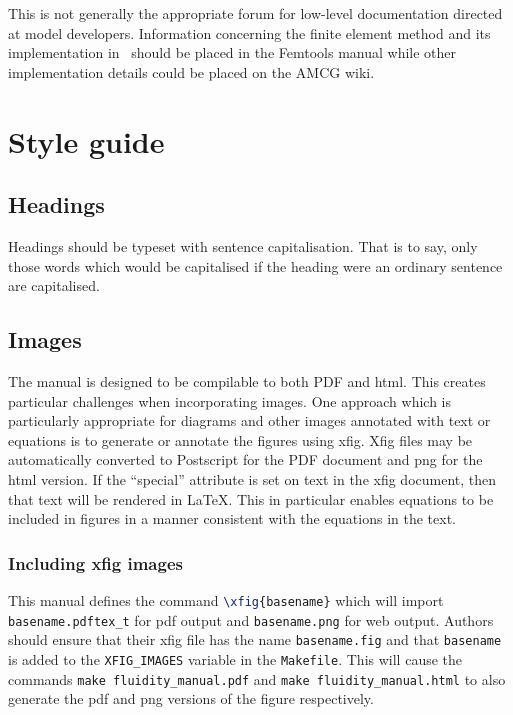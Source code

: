 This is not generally the appropriate forum for low-level documentation
directed at model developers. Information concerning the finite element
method and its implementation in \fluidity\ should be placed in the Femtools
manual while other implementation details could be placed on the AMCG wiki.

\section{Style guide}

\subsection{Headings}

Headings should be typeset with sentence capitalisation. That is to say,
only those words which would be capitalised if the heading were an ordinary
sentence are capitalised.

\subsection{Images}

The manual is designed to be compilable to both PDF and html. This creates
particular challenges when incorporating images. One approach which is
particularly appropriate for diagrams and other images annotated with text
or equations is to generate or annotate the figures using xfig. Xfig files
may be automatically converted to Postscript for the PDF document and png
for the html version. If the ``special'' attribute is set on text in the
xfig document, then that text will be rendered in \LaTeX. This in particular
enables equations to be included in figures in a manner consistent with the
equations in the text.

\subsubsection{Including xfig images}

This manual defines the command \lstinline[language=TeX]+\xfig{basename}+
which will import \verb+basename.pdftex_t+ for pdf output and
\verb+basename.png+ for web output. Authors should ensure that their xfig
file has the name \verb+basename.fig+ and that \verb+basename+ is added to
the \verb+XFIG_IMAGES+ variable in the \verb+Makefile+. This will cause the
commands \verb+make fluidity_manual.pdf+ and
\verb+make fluidity_manual.html+ to also generate the pdf and png versions
of the figure respectively.


